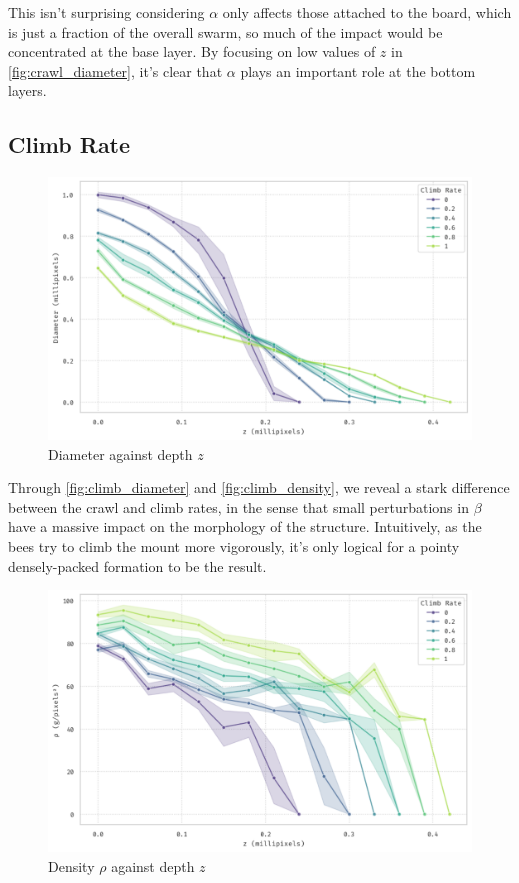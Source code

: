 \documentclass[a4paper,10pt]{article}
\begin{document}
\begin{multicols}{2}
    This isn't surprising considering $\alpha$
    only affects those attached to the board, which is just a fraction of the overall swarm,
    so much of the impact would be concentrated at the base layer. By focusing on low values of $z$ in
    \autoref{fig:crawl_diameter}, it's clear that $\alpha$ plays an important role at the
    bottom layers.

    \subsection{Climb Rate}

    \begin{figure}[H]
        \centering
        \includegraphics[width=\linewidth]{climb_diameter.pdf}
        \caption{Diameter against depth $z$}
        \label{fig:climb_diameter}
    \end{figure}

    Through \autoref{fig:climb_diameter} and \autoref{fig:climb_density}, we reveal a
    stark difference between the crawl and climb rates, in the sense that small
    perturbations in $\beta$ have a massive impact on the morphology of the structure.
    Intuitively, as the bees try to climb the mount more vigorously, it's only
    logical for a pointy densely-packed formation to be the result.


    \begin{figure}[H]
        \centering
        \includegraphics[width=\linewidth]{climb_density.pdf}
        \caption{Density $\rho$ against depth $z$}
        \label{fig:climb_density}
    \end{figure}


\end{multicols}
\end{document}
